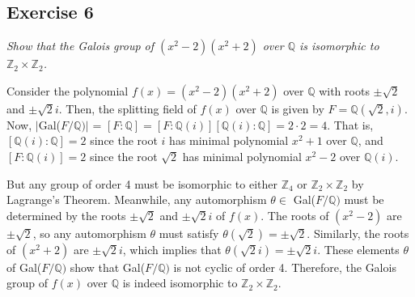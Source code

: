 \subsection*{Exercise 6}
\textit{Show that the Galois group of $(x^2 -2)(x^2 + 2)$ over $\mathbb{Q}$ is isomorphic to $\mathbb{Z}_2 \times \mathbb{Z}_2$.}

\vspace{5 mm}
Consider the polynomial $f(x) = (x^2 - 2)(x^2 + 2)$ over $\mathbb{Q}$ with roots $\pm\sqrt{2}$ and $\pm\sqrt{2}i$. Then, the splitting field of $f(x)$ over $\mathbb{Q}$ is given by $F = \mathbb{Q}(\sqrt{2},i)$. Now, $|$Gal($F/\mathbb{Q})|$ = $[F:\mathbb{Q}] = [F:\mathbb{Q}(i)][\mathbb{Q}(i):\mathbb{Q}] = 2\cdot2 = 4$. That is, $[\mathbb{Q}(i):\mathbb{Q}] = 2$ since the root $i$ has minimal polynomial $x^2 + 1$ over $\mathbb{Q}$, and $[F:\mathbb{Q}(i)] = 2$ since the root $\sqrt{2}$ has minimal polynomial $x^2 - 2$ over $\mathbb{Q}(i)$. 

But any group of order 4 must be isomorphic to either $\mathbb{Z}_4$ or $\mathbb{Z}_2 \times \mathbb{Z}_2$ by Lagrange's Theorem. Meanwhile, any automorphism $\theta \in$ Gal($F/\mathbb{Q})$ must be determined by the roots $\pm\sqrt{2}$ and $\pm\sqrt{2}i$ of $f(x)$. The roots of $(x^2 - 2)$ are $\pm\sqrt{2}$, so any automorphism $\theta$ must satisfy $\theta(\sqrt{2}) = \pm\sqrt{2}$. Similarly, the roots of $(x^2 + 2)$ are $\pm\sqrt{2}i$, which implies that $\theta(\sqrt{2}i) = \pm\sqrt{2}i$. These elements $\theta$ of Gal($F/\mathbb{Q})$ show that Gal($F/\mathbb{Q})$ is not cyclic of order 4. Therefore, the Galois group of $f(x)$ over $\mathbb{Q}$ is indeed isomorphic to $\mathbb{Z}_2 \times \mathbb{Z}_2$.